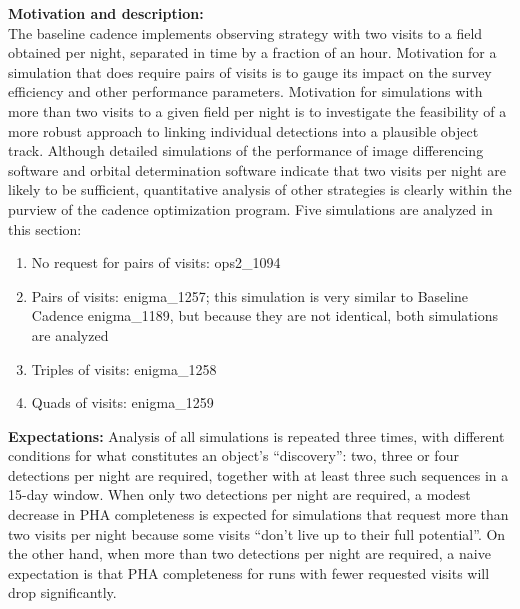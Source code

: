 \documentclass[manuscript]{article}
\begin{document}
{\bf Motivation and description:}\\
The baseline cadence implements observing strategy with two visits to a field obtained per night,
separated in time by a fraction of an hour. Motivation for a simulation that does require pairs of
visits is to gauge its impact on the survey efficiency and other performance 
parameters. Motivation for simulations with more than two visits to a given field per night
is to investigate the feasibility of a more robust approach to linking individual detections into 
a plausible object track. Although detailed simulations of the performance of image differencing 
software and orbital determination software indicate that two visits per night are likely to be 
sufficient, quantitative analysis of other strategies is clearly within the purview of the cadence 
optimization program.  Five simulations are analyzed in this section: 
\begin{enumerate}
\item No request for pairs of visits: ops2\_1094
\item Pairs of visits: enigma\_1257; this simulation is very similar to Baseline Cadence
enigma\_1189, but because they are not identical, both simulations are analyzed
\item Triples of visits: enigma\_1258
\item Quads of visits: enigma\_1259
\end{enumerate}



{\bf Expectations:}  Analysis of all simulations is repeated three times, with different
conditions for what constitutes an object's ``discovery'':  two, three or four 
detections per night are required, together with at least three such sequences in a
15-day window.  When only two detections per night are required, a modest decrease
in PHA completeness is expected for simulations that request more than two visits per night
because some visits ``don't live up to their full potential''. On the other hand, when more 
than two detections per night are required, a naive expectation is that PHA completeness
for runs with fewer requested visits will drop significantly. 
\\
\end{document}
